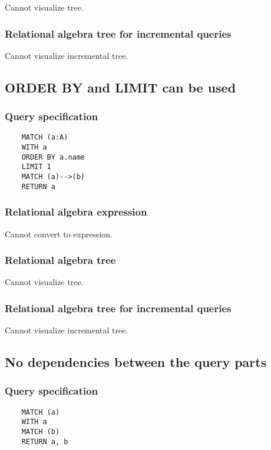 	Cannot visualize tree.

	\subsubsection*{Relational algebra tree for incremental queries}

	Cannot visualize incremental tree.
	\subsection{ORDER BY and LIMIT can be used}

	\subsubsection*{Query specification}

	\begin{lstlisting}
	MATCH (a:A)
	WITH a
	ORDER BY a.name
	LIMIT 1
	MATCH (a)-->(b)
	RETURN a
	\end{lstlisting}


	\subsubsection*{Relational algebra expression}

	Cannot convert to expression.

	\subsubsection*{Relational algebra tree}

	Cannot visualize tree.

	\subsubsection*{Relational algebra tree for incremental queries}

	Cannot visualize incremental tree.
	\subsection{No dependencies between the query parts}

	\subsubsection*{Query specification}

	\begin{lstlisting}
	MATCH (a)
	WITH a
	MATCH (b)
	RETURN a, b
	\end{lstlisting}


